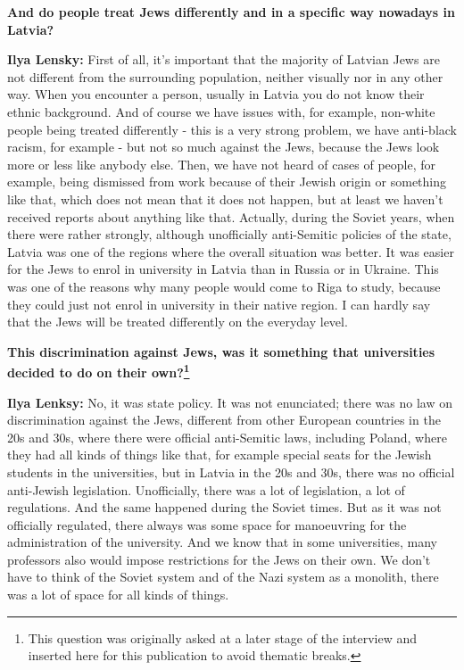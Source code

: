 \textbf{And do people treat Jews differently and in a specific way nowadays in Latvia?} 

\textbf{Ilya Lensky:} First of all, it's important that the majority of Latvian Jews are not different from the surrounding population, neither visually nor in any other way. When you encounter a person, usually in Latvia you do not know their ethnic background. And of course we have issues with, for example, non-white people being treated differently - this is a very strong problem, we have anti-black racism, for example - but not so much against the Jews, because the Jews look more or less like anybody else. Then, we have not heard of cases of people, for example, being dismissed from work because of their Jewish origin or something like that, which does not mean that it does not happen, but at least we haven't received reports about anything like that. Actually, during the Soviet years, when there were rather strongly, although unofficially anti-Semitic policies of the state, Latvia was one of the regions where the overall situation was better. It was easier for the Jews to enrol in university in Latvia than in Russia or in Ukraine. This was one of the reasons why many people would come to Riga to study, because they could just not enrol in university in their native region. I can hardly say that the Jews will be treated differently on the everyday level. 

\textbf{This discrimination against Jews, was it something that universities decided to do on their own?\footnote{This question was originally asked at a later stage of the interview and inserted here for this publication to avoid thematic breaks.}} 

\textbf{Ilya Lenksy:} No, it was state policy. 
It was not enunciated; there was no law on discrimination against the Jews, different from other European countries in the 20s and 30s, where there were official anti-Semitic laws, including Poland, where they had all kinds of things like that, for example special seats for the Jewish students in the universities, but in Latvia in the 20s and 30s, there was no official anti-Jewish legislation. Unofficially, there was a lot of legislation, a lot of regulations. And the same happened during the Soviet times. But as it was not officially regulated, there always was some space for manoeuvring for the administration of the university. And we know that in some universities, many professors also would impose restrictions for the Jews on their own. We don’t have to think of the Soviet system and of the Nazi system as a monolith, there was a lot of space for all kinds of things. 

